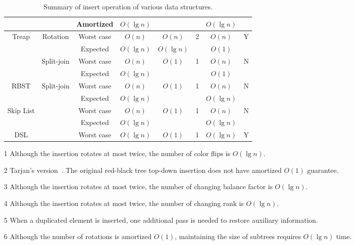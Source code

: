 \begin{table}[!t]
\begin{threeparttable}
\begin{tabular}{cccccccc}
  & & Amortized & $O(\lg n)$ & & & $O(\lg n)$ & \\
  \hline
  \multirow{4}{*}{Treap} & \multirow{2}{*}{Rotation} & Worst case & $O(n)$ & $O(n)$ & \multirow{2}{*}{2} & $O(n)$ & \multirow{2}{*}{Y} \\
  & & Expected & $O(\lg n)$ & $O(\lg n)$ & & $O(1)$ & \\
  & \multirow{2}{*}{Split-join} & Worst case & $O(n)$ & \multirow{2}{*}{$O(1)$} & \multirow{2}{*}{1} & $O(n)$ & \multirow{2}{*}{N} \\
  & & Expected & $O(\lg n)$ & & & $O(1)$ & \\
  \hline
  \multirow{2}{*}{RBST} & \multirow{2}{*}{Split-join}& Worst case & $O(n)$ & \multirow{2}{*}{$O(1)$} & \multirow{2}{*}{1} & $O(n)$ & \multirow{2}{*}{N} \\
  & & Expected & $O(\lg n)$ &  & & $O(\lg n)$ & \\
  \hline
  \multirow{2}{*}{Skip List} & & Worst case & $O(n)$ & \multirow{2}{*}{$O(1)$} & \multirow{2}{*}{1} & $O(n)$ & \multirow{2}{*}{N} \\
  & & Expected & $O(\lg n)$ & & & $O(\lg n)$ & \\
  \hline
  DSL & & Worst case & $O(\lg n)$ & $O(1)$ & 1 & $O(\lg n)$ & Y \\
\end{tabular}
\begin{tablenotes}\footnotesize
\item[1] Although the insertion rotates at most twice, the number of color flips is $O(\lg n)$.
\item[2] Tarjan's version~\cite{Tarjan1985}. The original red-black tree top-down insertion does not have amortized $O(1)$ guarantee.
\item[3] Although the insertion rotates at most twice, the number of changing balance factor is $O(\lg n)$.
\item[4] Although the insertion rotates at most twice, the number of changing rank is $O(\lg n)$.
\item[5] When a duplicated element is inserted, one additional pass is needed to restore auxiliary information.
\item[6] Although the number of rotations is amortized $O(1)$, maintaining the size of subtrees requires $O(\lg n)$ time.
\end{tablenotes}
\caption{Summary of insert operation of various data structures.}\label{insert}
\end{threeparttable}
\end{table}

